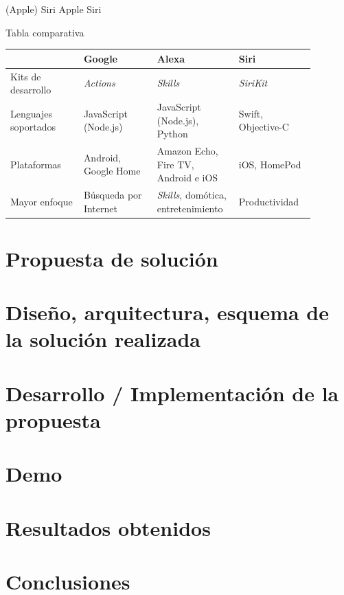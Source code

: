 \documentclass{beamer}
\begin{document}
  \begin{frame}[label=apple-siri]{ (Apple) Siri}
    Apple Siri
  \end{frame}

  \begin{frame}[c]{Tabla comparativa}
    \begin{tabular}{@{}|>{\raggedright\small}p{0.22\linewidth}|>{\raggedright\small}p{0.22\linewidth}|>{\raggedright\small}p{0.22\linewidth}|>{\raggedright\arraybackslash\small}p{0.22\linewidth}| @{}}
      \hline
      & \normalsize Google & \normalsize \textbf{Alexa} & \normalsize Siri \\
      \hline
      Kits de desarrollo & \emph{Actions} & \emph{Skills} & \emph{SiriKit} \\
      \hline
      Lenguajes soportados & JavaScript (Node.js) & JavaScript (Node.js), Python & Swift, Objective-C \\
      \hline
      Plataformas & Android, Google Home & Amazon Echo, Fire TV, Android e iOS & iOS, HomePod \\
      \hline
      Mayor enfoque & Búsqueda por Internet & \emph{Skills}, domótica, entretenimiento & Productividad \\
      \hline 
    \end{tabular}
  \end{frame}

  \section{Propuesta de solución}
  
  \section{Diseño, arquitectura, esquema de la solución realizada}
  
  \section{Desarrollo / Implementación de la propuesta}
  
  \section{Demo}
  
  \section{Resultados obtenidos}
  
  \section{Conclusiones} %
\end{document}
